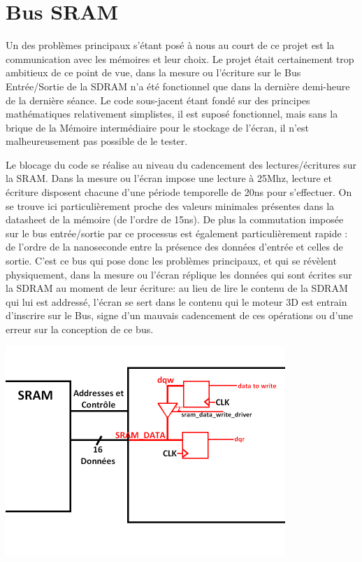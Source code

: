 \documentclass[10pt,a4paper]{report}
\begin{document}
\section{Bus SRAM}
Un des problèmes principaux s'étant posé à nous au court de ce projet est la communication avec les mémoires et leur choix. Le projet était certainement trop ambitieux de ce point de vue, dans la mesure ou l'écriture sur le Bus Entrée/Sortie de la SDRAM n'a été fonctionnel que dans la dernière demi-heure de la dernière séance. Le code sous-jacent étant fondé sur des principes mathématiques relativement simplistes, il est suposé fonctionnel, mais sans la brique de la Mémoire intermédiaire pour le stockage de l'écran, il n'est malheureusement pas possible de le tester.

Le blocage du code se réalise au niveau du cadencement des lectures/écritures sur la SRAM. Dans la mesure ou l'écran impose une lecture à 25Mhz, lecture et écriture disposent chacune d'une période temporelle de 20ns pour s'effectuer. On se trouve ici particulièrement proche des valeurs minimales présentes dans la datasheet de la mémoire (de l'ordre de 15ns). De plus la commutation imposée sur le bus entrée/sortie par ce processus est également particulièrement rapide : de l'ordre de la nanoseconde entre la présence des données d'entrée et celles de sortie. C'est ce bus qui pose donc les problèmes principaux, et qui se révèlent physiquement, dans la mesure ou l'écran réplique les données qui sont écrites sur la SDRAM au moment de leur écriture: au lieu de lire le contenu de la SDRAM qui lui est addressé, l'écran se sert dans le contenu qui le moteur 3D est entrain d'inscrire sur le Bus, signe d'un mauvais cadencement de ces opérations ou d'une erreur sur la conception de ce bus.

\begin{center}
\includegraphics[width=300pt]{gfx/sram.png}
\end{center}
\end{document}
